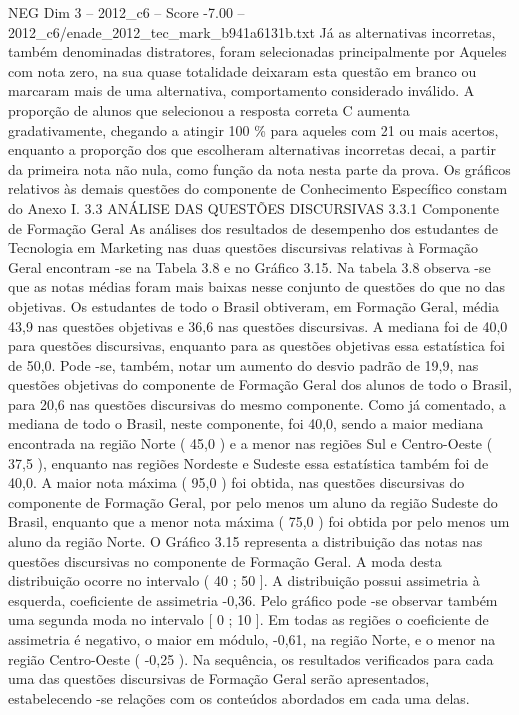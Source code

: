 \begin{textsample}{NEG Dim 3 – 2012\_c6 – Score -7.00 – 2012\_c6/enade\_2012\_tec\_mark\_b941a6131b.txt}
Já as alternativas incorretas, também denominadas distratores, foram selecionadas principalmente por Aqueles com nota zero, na sua quase totalidade deixaram esta questão em branco ou marcaram mais de uma alternativa, comportamento considerado inválido.
A proporção de alunos que selecionou a resposta correta C aumenta gradativamente, chegando a atingir 100 \% para aqueles com 21 ou mais acertos, enquanto a proporção dos que escolheram alternativas incorretas decai, a partir da primeira nota não nula, como função da nota nesta parte da prova.
Os gráficos relativos às demais questões do componente de Conhecimento Específico constam do Anexo I. 3.3 ANÁLISE DAS QUESTÕES DISCURSIVAS 3.3.1 Componente de Formação Geral As análises dos resultados de desempenho dos estudantes de Tecnologia em Marketing nas duas questões discursivas relativas à Formação Geral encontram -se na Tabela 3.8 e no Gráfico 3.15.
Na tabela 3.8 observa -se que as notas médias foram mais baixas nesse conjunto de questões do que no das objetivas.
Os estudantes de todo o Brasil obtiveram, em Formação Geral, média 43,9 nas questões objetivas e 36,6 nas questões discursivas.
A mediana foi de 40,0 para questões discursivas, enquanto para as questões objetivas essa estatística foi de 50,0.
Pode -se, também, notar um aumento do desvio padrão de 19,9, nas questões objetivas do componente de Formação Geral dos alunos de todo o Brasil, para 20,6 nas questões discursivas do mesmo componente.
Como já comentado, a mediana de todo o Brasil, neste componente, foi 40,0, sendo a maior mediana encontrada na região Norte ( 45,0 ) e a menor nas regiões Sul e Centro-Oeste ( 37,5 ), enquanto nas regiões Nordeste e Sudeste essa estatística também foi de 40,0.
A maior nota máxima ( 95,0 ) foi obtida, nas questões discursivas do componente de Formação Geral, por pelo menos um aluno da região Sudeste do Brasil, enquanto que a menor nota máxima ( 75,0 ) foi obtida por pelo menos um aluno da região Norte.
O Gráfico 3.15 representa a distribuição das notas nas questões discursivas no componente de Formação Geral.
A moda desta distribuição ocorre no intervalo ( 40 ; 50 ].
A distribuição possui assimetria à esquerda, coeficiente de assimetria -0,36.
Pelo gráfico pode -se observar também uma segunda moda no intervalo [ 0 ; 10 ].
Em todas as regiões o coeficiente de assimetria é negativo, o maior em módulo, -0,61, na região Norte, e o menor na região Centro-Oeste ( -0,25 ).
Na sequência, os resultados verificados para cada uma das questões discursivas de Formação Geral serão apresentados, estabelecendo -se relações com os conteúdos abordados em cada uma delas.

\end{textsample}
